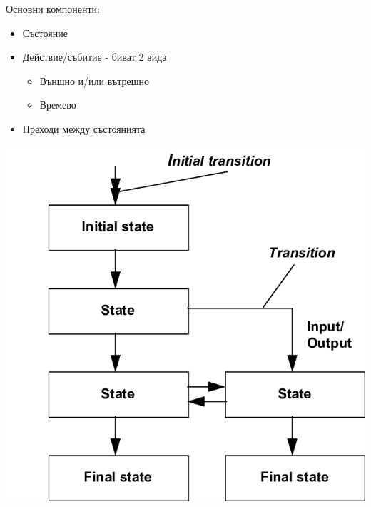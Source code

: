 \documentclass[fleqn,12pt]{article}
\begin{document}
\begin{multicols}{2}

Основни компоненти:
\begin{itemize}
	\item Състояние
	\item Действие/събитие - биват 2 вида
	\begin{itemize}
		\item Външно и/или вътрешно
		\item Времево
	\end{itemize}
	\item Преходи между състоянията
\end{itemize}

\includegraphics[scale=.25]{std}

\end{multicols}
\end{document}
